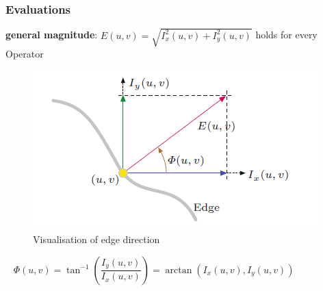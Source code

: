 \begin{frame}
	\frametitle{Evaluations}
	\begin{center}
		\textbf{general magnitude}: $E(u,v) = \sqrt{I_x^2(u,v)+I_y^2(u,v)}$
		\newline holds for every Operator 
		~\newline
		\begin{figure}
			\centering
			\includegraphics[width=0.5\linewidth]{images/EdgeDirection}
			\caption[Visualisation of edge direction]{Visualisation of edge direction}
			\label{fig:edgedir}
		\end{figure}
		~\newline
		$\Phi(u,v)=\tan^{-1}\left(\dfrac{I_y(u,v)}{I_x(u,v)}\right)=\arctan(I_x(u,v),I_y(u,v))$
	\end{center}
	
\end{frame}

